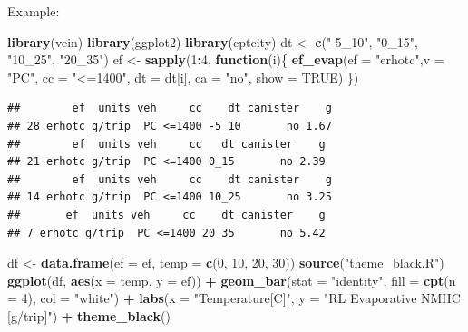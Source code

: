 \documentclass[12pt,graybox,envcountchap,sectrefs]{krantz}
\makeatletter
\newenvironment{Shaded}{\begin{snugshade}}{\end{snugshade}}
\newcommand{\KeywordTok}[1]{\textcolor[rgb]{0.13,0.29,0.53}{\textbf{#1}}}
\newcommand{\DataTypeTok}[1]{\textcolor[rgb]{0.13,0.29,0.53}{#1}}
\newcommand{\DecValTok}[1]{\textcolor[rgb]{0.00,0.00,0.81}{#1}}
\newcommand{\StringTok}[1]{\textcolor[rgb]{0.31,0.60,0.02}{#1}}
\newcommand{\OtherTok}[1]{\textcolor[rgb]{0.56,0.35,0.01}{#1}}
\newcommand{\ControlFlowTok}[1]{\textcolor[rgb]{0.13,0.29,0.53}{\textbf{#1}}}
\newcommand{\OperatorTok}[1]{\textcolor[rgb]{0.81,0.36,0.00}{\textbf{#1}}}
\newcommand{\NormalTok}[1]{#1}
\newenvironment{kframe}{%
\medskip{}
\setlength{\fboxsep}{.8em}
 \def\at@end@of@kframe{}%
 \ifinner\ifhmode%
  \def\at@end@of@kframe{\end{minipage}}%
  \begin{minipage}{\columnwidth}%
 \fi\fi%
 \def\FrameCommand##1{\hskip\@totalleftmargin \hskip-\fboxsep
 \colorbox{shadecolor}{##1}\hskip-\fboxsep
     \hskip-\linewidth \hskip-\@totalleftmargin \hskip\columnwidth}%
 \MakeFramed {\advance\hsize-\width
   \@totalleftmargin\z@ \linewidth\hsize
   \@setminipage}}%
 {\par\unskip\endMakeFramed%
 \at@end@of@kframe}
\renewenvironment{Shaded}{\begin{kframe}}{\end{kframe}}
\theoremstyle{definition}
\theoremstyle{definition}
\theoremstyle{definition}
\theoremstyle{remark}
\makeatother
\begin{document}
Example:

\begin{Shaded}
\begin{Highlighting}[]
\KeywordTok{library}\NormalTok{(vein)}
\KeywordTok{library}\NormalTok{(ggplot2)}
\KeywordTok{library}\NormalTok{(cptcity)}
\NormalTok{dt <-}\StringTok{ }\KeywordTok{c}\NormalTok{(}\StringTok{"-5_10"}\NormalTok{, }\StringTok{"0_15"}\NormalTok{, }\StringTok{"10_25"}\NormalTok{, }\StringTok{"20_35"}\NormalTok{)}
\NormalTok{ef <-}\StringTok{ }\KeywordTok{sapply}\NormalTok{(}\DecValTok{1}\OperatorTok{:}\DecValTok{4}\NormalTok{, }\ControlFlowTok{function}\NormalTok{(i)\{}
  \KeywordTok{ef_evap}\NormalTok{(}\DataTypeTok{ef =} \StringTok{"erhotc"}\NormalTok{,}\DataTypeTok{v =} \StringTok{"PC"}\NormalTok{, }\DataTypeTok{cc =} \StringTok{"<=1400"}\NormalTok{,}
                \DataTypeTok{dt =}\NormalTok{ dt[i], }\DataTypeTok{ca =} \StringTok{"no"}\NormalTok{,}
                \DataTypeTok{show =} \OtherTok{TRUE}\NormalTok{)}
\NormalTok{\})}
\end{Highlighting}
\end{Shaded}

\begin{verbatim}
##        ef  units veh     cc    dt canister    g
## 28 erhotc g/trip  PC <=1400 -5_10       no 1.67
##        ef  units veh     cc   dt canister    g
## 21 erhotc g/trip  PC <=1400 0_15       no 2.39
##        ef  units veh     cc    dt canister    g
## 14 erhotc g/trip  PC <=1400 10_25       no 3.25
##       ef  units veh     cc    dt canister    g
## 7 erhotc g/trip  PC <=1400 20_35       no 5.42
\end{verbatim}

\begin{Shaded}
\begin{Highlighting}[]
\NormalTok{df <-}\StringTok{ }\KeywordTok{data.frame}\NormalTok{(}\DataTypeTok{ef =}\NormalTok{ ef, }\DataTypeTok{temp =} \KeywordTok{c}\NormalTok{(}\DecValTok{0}\NormalTok{, }\DecValTok{10}\NormalTok{, }\DecValTok{20}\NormalTok{, }\DecValTok{30}\NormalTok{))}
\KeywordTok{source}\NormalTok{(}\StringTok{"theme_black.R"}\NormalTok{)}
\KeywordTok{ggplot}\NormalTok{(df, }\KeywordTok{aes}\NormalTok{(}\DataTypeTok{x =}\NormalTok{ temp, }\DataTypeTok{y =}\NormalTok{ ef)) }\OperatorTok{+}
\StringTok{  }\KeywordTok{geom_bar}\NormalTok{(}\DataTypeTok{stat =} \StringTok{"identity"}\NormalTok{, }\DataTypeTok{fill =} \KeywordTok{cpt}\NormalTok{(}\DataTypeTok{n =} \DecValTok{4}\NormalTok{), }\DataTypeTok{col =} \StringTok{"white"}\NormalTok{) }\OperatorTok{+}\StringTok{ }
\StringTok{  }\KeywordTok{labs}\NormalTok{(}\DataTypeTok{x =} \StringTok{"Temperature[C]"}\NormalTok{, }\DataTypeTok{y =} \StringTok{"RL Evaporative NMHC [g/trip]"}\NormalTok{) }\OperatorTok{+}\StringTok{ }
\StringTok{  }\KeywordTok{theme_black}\NormalTok{()}
\end{Highlighting}
\end{Shaded}
\end{document}
